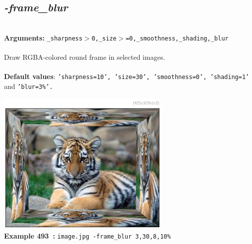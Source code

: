 \documentclass[a4paper,11pt,twoside]{book}
\begin{document}
\subsection{\emph{-frame\_blur} }\vspace*{-0.5em}
~\\\textbf{Arguments: } 
{\small \texttt{\_sharpness$>$0,\_size$>$=0,\_smoothness,\_shading,\_blur}}\\~\\
Draw RGBA-colored round frame in selected images.
~\\~\\\textbf{Default values}: {\small \texttt{'sharpness=10', 'size=30', 'smoothness=0', 'shading=1'} and \texttt{'blur=3\%'.}}
\begin{center}\includegraphics[keepaspectratio=true,height=7cm,width=\textwidth]{img/gmic_def493.jpg}\\
{\footnotesize \textbf{Example 493~:} \texttt{image.jpg -frame\_blur 3,30,8,10\%}}
\end{center}
\end{document}
